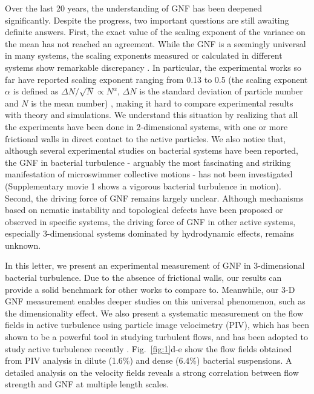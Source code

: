 \documentclass[twocolumn,aps,prl,amsmath,amssymb,longbibliography]{revtex4-2}
\begin{document}
Over the last 20 years, the understanding of GNF has been deepened significantly. Despite the progress, two important questions are still awaiting definite answers.
First, the exact value of the scaling exponent of the variance on the mean has not reached an agreement. While the GNF is a seemingly universal in many systems, the scaling exponents measured or calculated in different systems show remarkable discrepancy \cite{AditiSimha2002, Ramaswamy2003, Narayan2007, Chate2008, Deseigne2010, Zhang2010,
Dey2012, Saintillan2012, Schaller2013, Ngo2014, Nishiguchi2017, Kawaguchi2017, Mahault2019,
Karani2019}. In particular, the experimental works so far have reported scaling exponent ranging from 0.13 to 0.5 (the scaling exponent $\alpha$ is defined as $\Delta N /\sqrt N \propto N^\alpha$, $\Delta N$ is the standard deviation of particle number and $N$ is the mean number)
\cite{Narayan2007, Deseigne2010, Zhang2010, Schaller2013, Nishiguchi2017, Kawaguchi2017, Karani2019}, making it hard to compare experimental results with theory and simulations. We understand this situation by realizing that all the experiments have been done in 2-dimensional systems, with one or more frictional walls in direct contact to the active particles. We also notice that, although several experimental studies on bacterial systems have been reported, the GNF in bacterial turbulence - arguably the most fascinating and striking manifestation of microswimmer collective motions - has not been investigated (Supplementary movie 1 shows a vigorous bacterial turbulence in motion). Second, the driving force of GNF remains largely unclear. Although mechanisms based on nematic instability
\cite{AditiSimha2002, Ramaswamy2003, Narayan2007} and topological defects \cite{Saintillan2008b, Schaller2013} have been proposed or observed in specific systems, the driving force of GNF in other active systems, especially 3-dimensional systems dominated by hydrodynamic effects, remains unknown.


In this letter, we present an experimental measurement of GNF in 3-dimensional bacterial turbulence. Due to the absence of frictional walls, our results can provide a solid benchmark for other works to compare to. Meanwhile, our 3-D GNF measurement enables deeper studies on this universal phenomenon, such as the dimensionality effect. We also present a systematic measurement on the flow fields in active turbulence using particle image velocimetry (PIV), which has been shown to be a powerful tool in studying turbulent flows, and has been adopted to study active turbulence recently
\cite{Ishikawa2011, Wensink2012, Sokolov2012, Sanchez2012, Dunkel2013a, Schaller2013, Peng2020}. Fig.~\ref{fig:1}d-e show the flow fields obtained from PIV analysis in dilute (1.6\%) and dense (6.4\%) bacterial suspensions. A detailed analysis on the velocity fields reveals a strong correlation between flow strength and GNF at multiple length scales.
\end{document}
